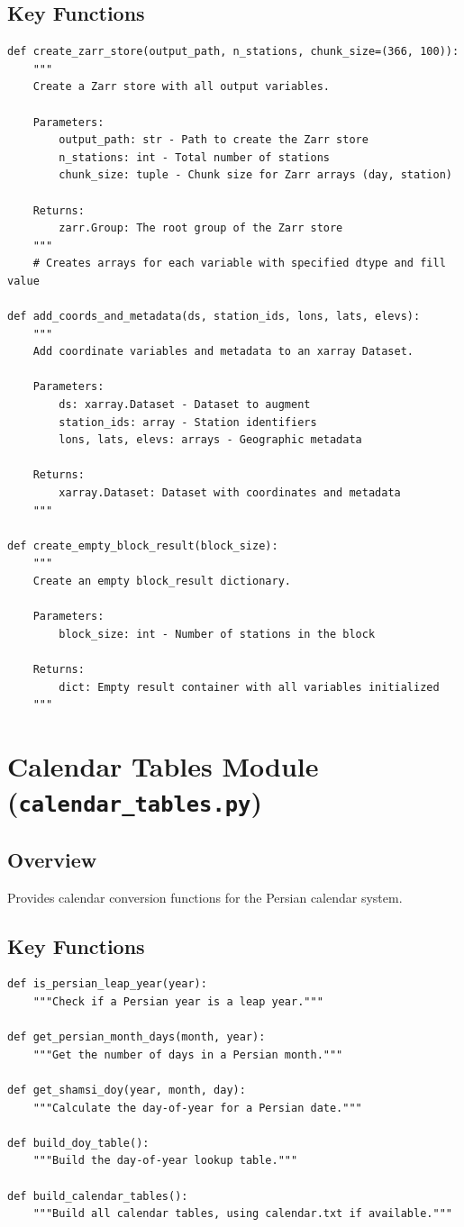 ﻿\documentclass[12pt,a4paper]{report}
\begin{document}
\subsection{Key Functions}
\begin{lstlisting}[caption=Zarr Schema Functions]
def create_zarr_store(output_path, n_stations, chunk_size=(366, 100)):
    """
    Create a Zarr store with all output variables.
    
    Parameters:
        output_path: str - Path to create the Zarr store
        n_stations: int - Total number of stations
        chunk_size: tuple - Chunk size for Zarr arrays (day, station)
    
    Returns:
        zarr.Group: The root group of the Zarr store
    """
    # Creates arrays for each variable with specified dtype and fill value

def add_coords_and_metadata(ds, station_ids, lons, lats, elevs):
    """
    Add coordinate variables and metadata to an xarray Dataset.
    
    Parameters:
        ds: xarray.Dataset - Dataset to augment
        station_ids: array - Station identifiers
        lons, lats, elevs: arrays - Geographic metadata
    
    Returns:
        xarray.Dataset: Dataset with coordinates and metadata
    """

def create_empty_block_result(block_size):
    """
    Create an empty block_result dictionary.
    
    Parameters:
        block_size: int - Number of stations in the block
    
    Returns:
        dict: Empty result container with all variables initialized
    """
\end{lstlisting}

\section{Calendar Tables Module (\texttt{calendar\_tables.py})}
\subsection{Overview}
Provides calendar conversion functions for the Persian calendar system.

\subsection{Key Functions}
\begin{lstlisting}[caption=Calendar Functions]
def is_persian_leap_year(year):
    """Check if a Persian year is a leap year."""
    
def get_persian_month_days(month, year):
    """Get the number of days in a Persian month."""
    
def get_shamsi_doy(year, month, day):
    """Calculate the day-of-year for a Persian date."""
    
def build_doy_table():
    """Build the day-of-year lookup table."""
    
def build_calendar_tables():
    """Build all calendar tables, using calendar.txt if available."""
\end{lstlisting}
\end{document}
